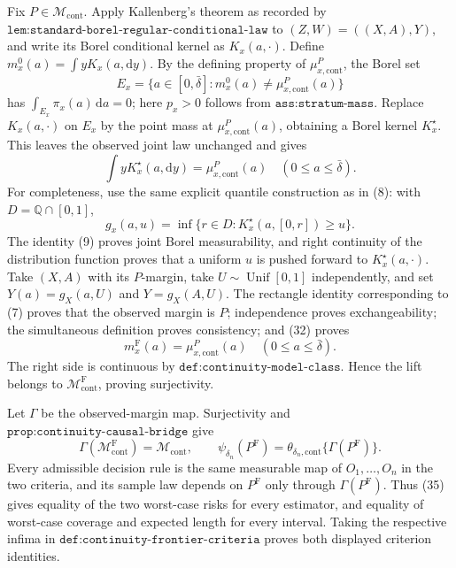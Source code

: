 Fix \(P\in\mathcal M_{\mathrm{cont}}\).  Apply Kallenberg's theorem as recorded by \(\texttt{lem:standard-borel-regular-conditional-law}\) to \((Z,W)=((X,A),Y)\), and write its Borel conditional kernel as \(K_x(a,\cdot)\).  Define \(m_x^0(a)=\int yK_x(a,\mathrm dy)\).  By the defining property of \(\mu_{x,\mathrm{cont}}^P\), the Borel set
\[
 E_x=\{a\in[0,\bar\delta]:m_x^0(a)\ne\mu_{x,\mathrm{cont}}^P(a)\} \tag{31}
\]
has \(\int_{E_x}\pi_x(a)\,\mathrm da=0\); here \(p_x>0\) follows from \(\texttt{ass:stratum-mass}\).  Replace \(K_x(a,\cdot)\) on \(E_x\) by the point mass at \(\mu_{x,\mathrm{cont}}^P(a)\), obtaining a Borel kernel \(K_x^\star\).  This leaves the observed joint law unchanged and gives
\[
 \int yK_x^\star(a,\mathrm dy)=\mu_{x,\mathrm{cont}}^P(a)
 \quad(0\leq a\leq\bar\delta). \tag{32}
\]
For completeness, use the same explicit quantile construction as in (8): with \(D=\mathbb Q\cap[0,1]\),
\[
 g_x(a,u)=\inf\{r\in D:K_x^\star(a,[0,r])\geq u\}. \tag{33}
\]
The identity (9) proves joint Borel measurability, and right continuity of the distribution function proves that a uniform \(u\) is pushed forward to \(K_x^\star(a,\cdot)\).  Take \((X,A)\) with its \(P\)-margin, take \(U\sim\operatorname{Unif}[0,1]\) independently, and set \(Y(a)=g_X(a,U)\) and \(Y=g_X(A,U)\).  The rectangle identity corresponding to (7) proves that the observed margin is \(P\); independence proves exchangeability; the simultaneous definition proves consistency; and (32) proves
\[
 m_x^{\mathrm F}(a)=\mu_{x,\mathrm{cont}}^P(a)
 \quad(0\leq a\leq\bar\delta). \tag{34}
\]
The right side is continuous by \(\texttt{def:continuity-model-class}\).  Hence the lift belongs to \(\mathcal M_{\mathrm{cont}}^{\mathrm F}\), proving surjectivity.

Let \(\Gamma\) be the observed-margin map.  Surjectivity and \(\texttt{prop:continuity-causal-bridge}\) give
\[
 \Gamma(\mathcal M_{\mathrm{cont}}^{\mathrm F})=\mathcal M_{\mathrm{cont}},
 \qquad
 \psi_{\delta_n}(P^{\mathrm F})
 =\theta_{\delta_n,\mathrm{cont}}\{\Gamma(P^{\mathrm F})\}. \tag{35}
\]
Every admissible decision rule is the same measurable map of \(O_1,\ldots,O_n\) in the two criteria, and its sample law depends on \(P^{\mathrm F}\) only through \(\Gamma(P^{\mathrm F})\).  Thus (35) gives equality of the two worst-case risks for every estimator, and equality of worst-case coverage and expected length for every interval.  Taking the respective infima in \(\texttt{def:continuity-frontier-criteria}\) proves both displayed criterion identities.